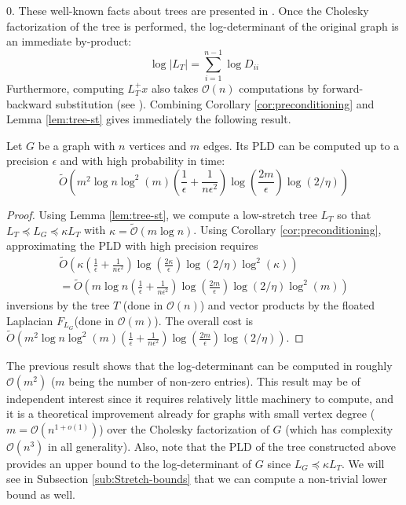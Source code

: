 $0$. These well-known facts about trees are presented in \cite{Spielman2009a}.
Once the Cholesky factorization of the tree is performed, the log-determinant
of the original graph is an immediate by-product: 
\[
\log\left|L_{T}\right|=\sum_{i=1}^{n-1}\log D_{ii}
\]
Furthermore, computing $L_{T}^{+}x$ also takes $\mathcal{O}\left(n\right)$
computations by forward-backward substitution (see \cite{duff1986direct}).
Combining Corollary \ref{cor:preconditioning} and Lemma \eqref{lem:tree-st}
gives immediately the following result. 
\begin{theorem}
\label{thm:PLD-tree}Let $G$ be a graph with $n$ vertices and $m$
edges. Its PLD can be computed up to a precision $\epsilon$ and with
high probability in time: 
\[
\tilde{O}\left(m^{2}\log n\log^{2}\left(m\right)\left(\frac{1}{\epsilon}+\frac{1}{n\epsilon^{2}}\right)\log\left(\frac{2m}{\epsilon}\right)\log\left(2/\eta\right)\right)
\]
\end{theorem}
\begin{proof}
Using Lemma \eqref{lem:tree-st}, we compute a low-stretch tree $L_{T}$
so that $L_{T}\preceq L_{G}\preceq\kappa L_{T}$ with $\kappa=\tilde{\mathcal{O}}\left(m\log n\right)$.
Using Corollary \eqref{cor:preconditioning}, approximating the PLD
with high precision requires 
\begin{eqnarray*}
\tilde{O}\left(\kappa\left(\frac{1}{\epsilon}+\frac{1}{n\epsilon^{2}}\right)\log\left(\frac{2\kappa}{\epsilon}\right)\log\left(2/\eta\right)\log^{2}\left(\kappa\right)\right)\\
=\tilde{O}\left(m\log n\left(\frac{1}{\epsilon}+\frac{1}{n\epsilon^{2}}\right)\log\left(\frac{2m}{\epsilon}\right)\log\left(2/\eta\right)\log^{2}\left(m\right)\right)
\end{eqnarray*}
inversions by the tree $T$ (done in $\mathcal{O}\left(n\right)$)
and vector products by the floated Laplacian $F_{L_{G}}$(done in
$\mathcal{O}\left(m\right)$). The overall cost is $\tilde{O}\left(m^{2}\log n\log^{2}\left(m\right)\left(\frac{1}{\epsilon}+\frac{1}{n\epsilon^{2}}\right)\log\left(\frac{2m}{\epsilon}\right)\log\left(2/\eta\right)\right)$. 
\end{proof}
The previous result shows that the log-determinant can be computed
in roughly $\mathcal{O}\left(m^{2}\right)$ ($m$ being the number
of non-zero entries). This result may be of independent interest since
it requires relatively little machinery to compute, and it is a theoretical
improvement already for graphs with small vertex degree ($m=\mathcal{O}\left(n^{1+o\left(1\right)}\right)$)
over the Cholesky factorization of $G$ (which has complexity $\mathcal{O}\left(n^{3}\right)$
in all generality). Also, note that the PLD of the tree constructed
above provides an upper bound to the log-determinant of $G$ since
$L_{G}\preceq\kappa L_{T}$. We will see in Subsection \ref{sub:Stretch-bounds}
that we can compute a non-trivial lower bound as well. 
